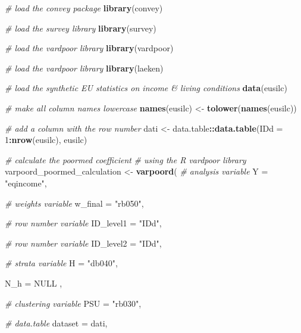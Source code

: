 \documentclass[
]{book}
\newenvironment{Shaded}{\begin{snugshade}}{\end{snugshade}}
\newcommand{\AttributeTok}[1]{\textcolor[rgb]{0.13,0.29,0.53}{#1}}
\newcommand{\CommentTok}[1]{\textcolor[rgb]{0.56,0.35,0.01}{\textit{#1}}}
\newcommand{\ConstantTok}[1]{\textcolor[rgb]{0.56,0.35,0.01}{#1}}
\newcommand{\DecValTok}[1]{\textcolor[rgb]{0.00,0.00,0.81}{#1}}
\newcommand{\FunctionTok}[1]{\textcolor[rgb]{0.13,0.29,0.53}{\textbf{#1}}}
\newcommand{\NormalTok}[1]{#1}
\newcommand{\OtherTok}[1]{\textcolor[rgb]{0.56,0.35,0.01}{#1}}
\newcommand{\SpecialCharTok}[1]{\textcolor[rgb]{0.81,0.36,0.00}{\textbf{#1}}}
\newcommand{\StringTok}[1]{\textcolor[rgb]{0.31,0.60,0.02}{#1}}
\begin{document}
\begin{Shaded}
\begin{Highlighting}[]
\CommentTok{\# load the convey package}
\FunctionTok{library}\NormalTok{(convey)}

\CommentTok{\# load the survey library}
\FunctionTok{library}\NormalTok{(survey)}

\CommentTok{\# load the vardpoor library}
\FunctionTok{library}\NormalTok{(vardpoor)}

\CommentTok{\# load the vardpoor library}
\FunctionTok{library}\NormalTok{(laeken)}

\CommentTok{\# load the synthetic EU statistics on income \& living conditions}
\FunctionTok{data}\NormalTok{(eusilc)}

\CommentTok{\# make all column names lowercase}
\FunctionTok{names}\NormalTok{(eusilc) }\OtherTok{\textless{}{-}} \FunctionTok{tolower}\NormalTok{(}\FunctionTok{names}\NormalTok{(eusilc))}

\CommentTok{\# add a column with the row number}
\NormalTok{dati }\OtherTok{\textless{}{-}}\NormalTok{ data.table}\SpecialCharTok{::}\FunctionTok{data.table}\NormalTok{(}\AttributeTok{IDd =} \DecValTok{1}\SpecialCharTok{:}\FunctionTok{nrow}\NormalTok{(eusilc), eusilc)}

\CommentTok{\# calculate the poormed coefficient}
\CommentTok{\# using the R vardpoor library}
\NormalTok{varpoord\_poormed\_calculation }\OtherTok{\textless{}{-}}
  \FunctionTok{varpoord}\NormalTok{(}
    \CommentTok{\# analysis variable}
    \AttributeTok{Y =} \StringTok{"eqincome"}\NormalTok{,}
    
    \CommentTok{\# weights variable}
    \AttributeTok{w\_final =} \StringTok{"rb050"}\NormalTok{,}
    
    \CommentTok{\# row number variable}
    \AttributeTok{ID\_level1 =} \StringTok{"IDd"}\NormalTok{,}
    
    \CommentTok{\# row number variable}
    \AttributeTok{ID\_level2 =} \StringTok{"IDd"}\NormalTok{,}
    
    \CommentTok{\# strata variable}
    \AttributeTok{H =} \StringTok{"db040"}\NormalTok{,}
    
    \AttributeTok{N\_h =} \ConstantTok{NULL}\NormalTok{ ,}
    
    \CommentTok{\# clustering variable}
    \AttributeTok{PSU =} \StringTok{"rb030"}\NormalTok{,}
    
    \CommentTok{\# data.table}
    \AttributeTok{dataset =}\NormalTok{ dati,}
    

\end{Highlighting}
\end{Shaded}
\end{document}
